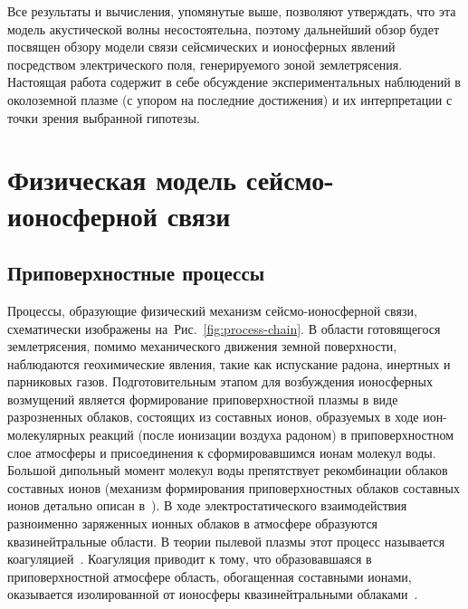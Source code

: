 \documentclass[12pt, oneside, a4paper]{article}
\begin{document}
Все результаты и вычисления, упомянутые выше, позволяют утверждать, что эта модель акустической волны несостоятельна, поэтому дальнейший обзор будет посвящен обзору модели связи сейсмических и ионосферных явлений посредством электрического поля, генерируемого зоной землетрясения. Настоящая работа содержит в себе обсуждение экспериментальных наблюдений в околоземной плазме (с упором на последние достижения) и их интерпретации с точки зрения выбранной гипотезы.

\section{Физическая модель сейсмо-ионосферной связи}
\subsection{Приповерхностные процессы}
Процессы, образующие физический механизм сейсмо-ионосферной связи, схематически изображены на~\mbox{Рис. \ref{fig:process-chain}}. В области готовящегося землетрясения, помимо механического движения земной поверхности, наблюдаются геохимические явления, такие как испускание радона, инертных и парниковых газов. Подготовительным этапом для возбуждения ионосферных возмущений является формирование приповерхностной плазмы в виде разрозненных облаков, состоящих из составных ионов, образуемых в ходе ион-молекулярных реакций (после ионизации воздуха радоном) в приповерхностном слое атмосферы и присоединения к сформировавшимся ионам молекул воды. Большой дипольный момент молекул воды препятствует рекомбинации облаков составных ионов (механизм формирования приповерхностных облаков составных ионов детально описан в~\cite{Pulinets_Boyarchuk:2004}). В ходе электростатического взаимодействия разноименно заряженных ионных облаков в атмосфере образуются квазинейтральные области. В теории пылевой плазмы этот процесс называется коагуляцией~\cite{Horanyi_Goertz:1990}. Коагуляция приводит к тому, что образовавшаяся в приповерхностной атмосфере область, обогащенная составными ионами, оказывается изолированной от ионосферы квазинейтральными облаками~\cite{Pulinets:2002a}.
\end{document}
